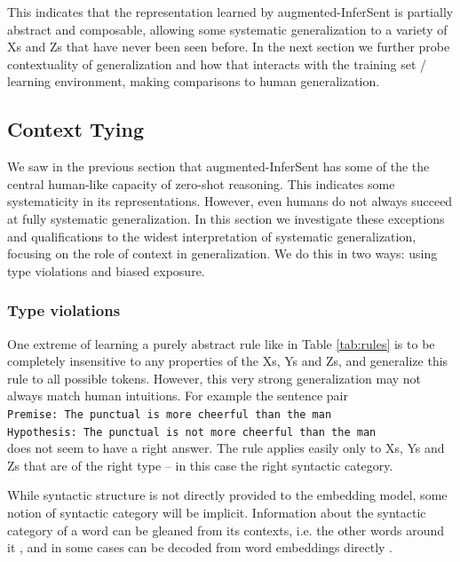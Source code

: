 This indicates that the representation learned by augmented-InferSent is partially abstract and composable, allowing some systematic generalization to a variety of Xs and Zs that have never been seen before. In the next section we further probe contextuality of generalization and how that interacts with the training set / learning environment, making comparisons to human generalization.

\subsection{Context Tying}
We saw in the previous section that augmented-InferSent has some of the the central human-like capacity of zero-shot reasoning. This indicates some systematicity in its representations. However, even humans do not always succeed at fully systematic generalization. In this section we investigate these exceptions and qualifications to the widest interpretation of systematic generalization, focusing on the role of context in generalization. We do this in two ways: using type violations and biased exposure.

\subsubsection{Type violations}
One extreme of learning a purely abstract rule like in Table \ref{tab:rules} is to be completely insensitive to any properties of the Xs, Ys and Zs, and generalize this rule to all possible tokens. However, this very strong generalization may not always match human intuitions. For example the sentence pair \\
{\tt Premise: The punctual is more cheerful than the man \\ Hypothesis: The punctual is not more cheerful than the man\\}
\noindent does not seem to have a right answer. The rule applies easily only to Xs, Ys and Zs that are of the right type -- in this case the right syntactic category. 

While syntactic structure is not directly provided to the embedding model, some notion of syntactic category will be implicit. Information about the syntactic category of a word can be gleaned from its contexts, i.e. the other words around it \citep{chomsky1993lectures, redington1998distributional, socher2010learning}, and in some cases can be decoded from word embeddings directly \citep{pennington14}.


